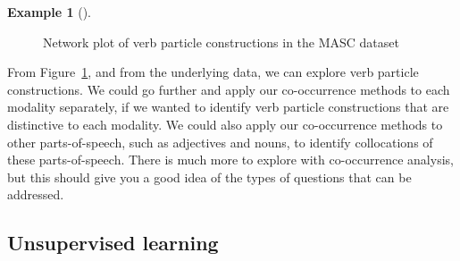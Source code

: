 \documentclass[
  letterpaper,
]{latex/krantz}
\theoremstyle{definition}
\newtheorem{example}{Example}[chapter]
\theoremstyle{remark}
\begin{document}
\begin{example}[]
\begin{figure}[H]


\caption{\label{fig-eda-masc-verb-part-network}Network plot of verb
particle constructions in the MASC dataset}

\end{figure}%

\end{example}

From Figure~\ref{fig-eda-masc-verb-part-network}, and from the
underlying data, we can explore verb particle constructions. We could go
further and apply our co-occurrence methods to each modality separately,
if we wanted to identify verb particle constructions that are
distinctive to each modality. We could also apply our co-occurrence
methods to other parts-of-speech, such as adjectives and nouns, to
identify collocations of these parts-of-speech. There is much more to
explore with co-occurrence analysis, but this should give you a good
idea of the types of questions that can be addressed.

\subsection{Unsupervised learning}\label{sec-eda-unsupervised}
\end{document}
